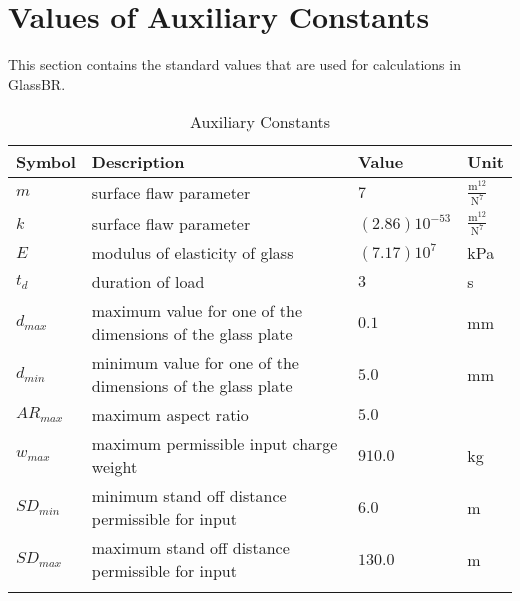 \documentclass[12pt]{article}
\begin{document}
\section{Values of Auxiliary Constants}
\label{Sec:ValuofAuxiCons}
This section contains the standard values that are used for calculations in GlassBR.
\begin{longtable}{l l l l}
\toprule
Symbol & Description & Value & Unit
\\
\midrule
$m$ & surface flaw parameter & $7$ & $\frac{\text{m}^{12}}{\text{N}^{7}}$
\\
$k$ & surface flaw parameter & $\left(2.86\right)10^{-53}$ & $\frac{\text{m}^{12}}{\text{N}^{7}}$
\\
$E$ & modulus of elasticity of glass & $\left(7.17\right)10^{7}$ & kPa
\\
$t_{d}$ & duration of load & $3$ & s
\\
$d_{max}$ & maximum value for one of the dimensions of the glass plate & $0.1$ & mm
\\
$d_{min}$ & minimum value for one of the dimensions of the glass plate & $5.0$ & mm
\\
$AR_{max}$ & maximum aspect ratio & $5.0$ & 
\\
$w_{max}$ & maximum permissible input charge weight & $910.0$ & kg
\\
$SD_{min}$ & minimum stand off distance permissible for input & $6.0$ & m
\\
$SD_{max}$ & maximum stand off distance permissible for input & $130.0$ & m
\\
\bottomrule
\caption{Auxiliary Constants}
\label{Table:AuxiCons}
\end{longtable}
\end{document}
